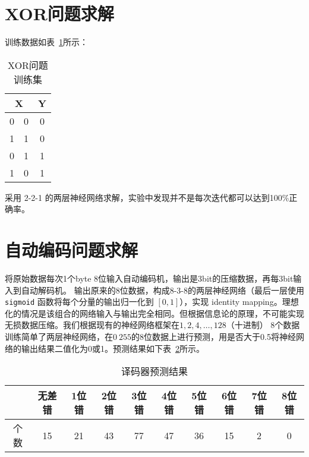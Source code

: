 \documentclass{ctexart}
\begin{document}
\section{XOR问题求解}
训练数据如表~\ref{tab}所示：
    \begin{table}[!ht]
        \centering
        \begin{tabular}{|cc|c|}
            \hline
            \multicolumn{2}{|c|}{X}  & Y \\
            \hline
            0 & 0 & 0 \\
            1 & 1 & 0 \\
            0 & 1 & 1 \\
            1 & 0 & 1 \\
            \hline
        \end{tabular}
   \caption{XOR问题训练集}\label{tab}
    \end{table}    
采用 2-2-1 的两层神经网络求解，实验中发现并不是每次迭代都可以达到100\%正确率。
\section{自动编码问题求解}
将原始数据每次1个byte 8位输入自动编码机，输出是3bit的压缩数据，再每3bit输入到自动解码机。
输出原来的8位数据，构成8-3-8的两层神经网络（最后一层使用 \texttt{sigmoid} 函数将每个分量的输出归一化到 $[0,1] $），实现 identity mapping。理想化的情况是该组合的网络输入与输出完全相同。但根据信息论的原理，不可能实现无损数据压缩。我们根据现有的神经网络框架在$1, 2,4,\dots,128$（十进制） 8个数据训练简单了两层神经网络，在$0~255$的8位数据上进行预测，用是否大于0.5将神经网络的输出结果二值化为0或1。预测结果如下表~\ref{encoder}所示。

\begin{table}[!ht]
\centering
\begin{tabular}{*{10}{c}}
\hline
& 无差错 & 1位错 & 2位错 & 3位错 & 4位错 & 5位错 & 6位错 & 7位错 & 8位错 \\
\hline
个数 &15 &  21 & 43 & 77 & 47 & 36 & 15 &  2 & 0 \\
\hline
\end{tabular}
\caption{译码器预测结果}\label{encoder}
\end{table}
\end{document}
